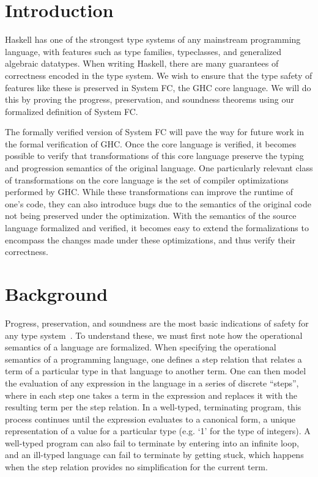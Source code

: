 \documentclass{sig-alternate}
\begin{document}
\section{Introduction}
\label{sec:intro}
Haskell has one of the strongest type systems of any mainstream programming language, with features such as type families, typeclasses, and generalized algebraic datatypes. When writing Haskell, there are many guarantees of correctness encoded in the type system. We wish to ensure that the type safety of features like these is preserved in System FC, the GHC core language.  We will do this by proving the progress, preservation, and soundness theorems using our formalized definition of System FC.



The formally verified version of System FC will pave the way for future work in the formal verification of GHC. Once the core language is verified, it becomes possible to verify that transformations of this core language preserve the typing and progression semantics of the original language. One particularly relevant class of transformations on the core language is the set of compiler optimizations performed by GHC. While these transformations can improve the runtime of one's code, they can also introduce bugs due to the semantics of the original code not being preserved under the optimization. With the semantics of the source language formalized and verified, it becomes easy to extend the formalizations to encompass the changes made under these optimizations, and thus verify their correctness. 

\section{Background}
\label{sec:background}
Progress, preservation, and soundness are the most basic indications of safety for any type system~\cite{Pierce:TAPL}. To understand these, we must first note how the operational semantics of a language are formalized. When specifying the operational semantics of a programming language, one defines a step relation that relates a term of a particular type in that language to another term. One can then model the evaluation of any expression in the language in a series of discrete ``steps'', where in each step one takes a term in the expression and replaces it with the resulting term per the step relation. In a well-typed, terminating program, this process continues until the expression evaluates to a canonical form, a unique representation of a value for a particular type (e.g. `1' for the type of integers). A well-typed program can also fail to terminate by entering into an infinite loop, and an ill-typed language can fail to terminate by getting stuck, which happens when the step relation provides no simplification for the current term.
\end{document}
